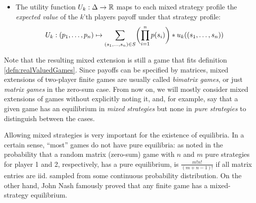 \documentclass[a4paper]{scrreprt}
\begin{document}
\begin{defn}
\begin{itemize}
            \item
            The utility function $U_k: \Delta \to \mathbb{R}$ maps to each mixed strategy profile the \emph{expected value} of the $k$'th players payoff under that strategy profile:
            \begin{gather}
                U_k: 
                (p_1, \dots, p_n) 
                \mapsto
                \sum_{(s_1, \dots, s_n) \in S} \biggl(\prod_{i=1}^{n} p(s_i)\biggr) * u_k( (s_1, \dots, s_n) )
                \label{eq:mixedStrategyUtility}
            \end{gather}
        \end{itemize}
    \end{defn}
    
    Note that the resulting mixed extension is still a game that fits definition \ref{defn:realValuedGames}.
    Since payoffs can be specified by matrices, mixed extensions of two-player finite %
    games are usually called \emph{bimatrix games}, or just \emph{matrix games} in the zero-sum case.
    From now on, we will mostly consider mixed extensions of games without explicitly noting it, and, for example, say that a given game has an equilibrium in \emph{mixed strategies} but none in \emph{pure strategies} to distinguish between the cases.
    
    Allowing mixed strategies is very important for the existence of equilibria. In a certain sense, “most” games do not have pure equilibria: as noted in \cite{bib:matsumotoGameTheory} %
    the probability that a random matrix (zero-sum) game with $n$ and $m$ pure strategies for player 1 and 2, respectively, has a pure equilibrium, is $\frac{m! n!}{(m+n-1)!}$ if all matrix entries are iid. 
    sampled from some continuous probability distribution. On the other hand, John Nash %
    famously proved that any finite game has a mixed-strategy equilibrium. 
    
    
    
\end{document}
